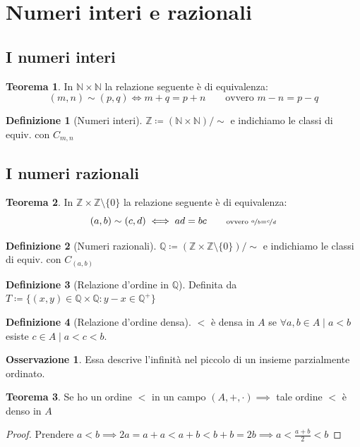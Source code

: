 \documentclass[a4paper,10pt]{article}
\theoremstyle{definition}
\newcommand{\na}{\mathbb{N}} %
\newcommand{\za}{\mathbb{Z}} %
\newcommand{\qu}{\mathbb{Q}} %
\theoremstyle{indentdefinition}
\newtheorem{defn}{Definizione}[section]
\theoremstyle{indentpostulate}
\theoremstyle{indenttheorem}
\newtheorem{thm}{Teorema}[section]
\theoremstyle{myremark}
\newtheorem*{rem*}{Osservazione}
\theoremstyle{indentgeneral}
\begin{document}
\section{Numeri interi e razionali}
\subsection{I numeri interi}
\begin{thm}
    In $\na\times\na$ la relazione seguente è di equivalenza:
    $$(m,n)\sim (p,q)\iff m+q=p+n \qquad {\scriptstyle \text{ovvero }m-n=p-q}$$
\end{thm}

\begin{defn}[Numeri interi]
    $\za\coloneqq (\na\times\na)/\sim$ e indichiamo le classi di equiv. con $C_{m,n}$
\end{defn}

\subsection{I numeri razionali}
\begin{thm}
    In $\za\times\za\setminus\{0\}$ la relazione seguente è di equivalenza:
    $$(a,b)\sim (c,d)\iff ad=bc \qquad {\scriptstyle \text{ovvero }\nicefrac{a}{b}=\nicefrac{c}{d}}$$
\end{thm}

\begin{defn}[Numeri razionali]
    $\qu\coloneqq (\za\times\za\setminus\{0\})/\sim$ e indichiamo le classi di equiv. con $C_{(a,b)}$
\end{defn}

\begin{defn}[Relazione d'ordine in $\qu$]
    Definita da $T\coloneqq\{(x,y)\in \qu\times\qu:y-x\in\qu^+\}$
\end{defn}

\begin{defn}[Relazione d'ordine densa]
    $<$ è densa in $A$ se $\forall a,b\in A\mid a<b$ esiste $c\in A\mid a<c<b$.
\end{defn}
\begin{rem*}
    Essa descrive l'infinità nel piccolo di un insieme parzialmente ordinato.
\end{rem*}
\begin{thm}
    Se ho un ordine $<$ in un campo $(A,+,\cdot)\implies$ tale ordine $<$ è denso in $A$
\end{thm}
\begin{proof}
    Prendere $a<b\implies 2a=a+a<a+b<b+b=2b\implies a<\frac{a+b}{2}<b$
\end{proof}
\end{document}
